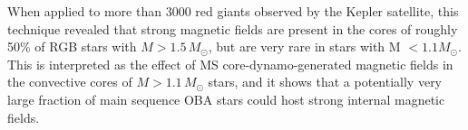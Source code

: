 When applied to more than 3000 red giants observed by the Kepler satellite, this technique revealed that strong magnetic fields are present in the cores of roughly 50\% of RGB stars with $M \! > \! 1.5 \, M_\odot$, but are very rare in stars with M $< 1.1M_\odot$. This is interpreted as the effect of MS core-dynamo-generated magnetic fields in the convective cores of $M \! > \! 1.1 \, M_\odot$ stars, and it shows that a potentially very large fraction of main sequence OBA stars could host strong internal magnetic fields.



